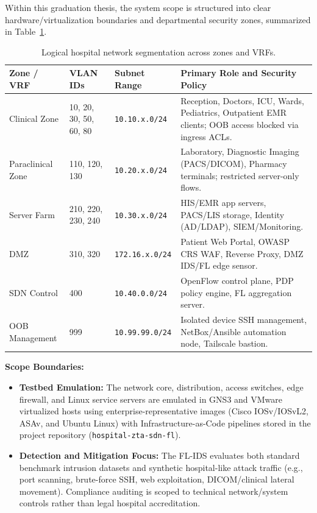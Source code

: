 Within this graduation thesis, the system scope is structured into clear hardware/virtualization boundaries and departmental security zones, summarized in Table~\ref{tab:vlan_zones}.

\begin{table}[htbp]
  \centering
  \caption{Logical hospital network segmentation across zones and VRFs.}
  \label{tab:vlan_zones}
  \begin{tabular}{@{}l l l p{5.8cm}@{}}
    \toprule
    \textbf{Zone / VRF} & \textbf{VLAN IDs} & \textbf{Subnet Range} & \textbf{Primary Role and Security Policy} \\
    \midrule
    Clinical Zone & 10, 20, 30, 50, 60, 80 & \texttt{10.10.x.0/24} & Reception, Doctors, ICU, Wards, Pediatrics, Outpatient EMR clients; OOB access blocked via ingress ACLs. \\
    Paraclinical Zone & 110, 120, 130 & \texttt{10.20.x.0/24} & Laboratory, Diagnostic Imaging (PACS/DICOM), Pharmacy terminals; restricted server-only flows. \\
    Server Farm & 210, 220, 230, 240 & \texttt{10.30.x.0/24} & HIS/EMR app servers, PACS/LIS storage, Identity (AD/LDAP), SIEM/Monitoring. \\
    DMZ & 310, 320 & \texttt{172.16.x.0/24} & Patient Web Portal, OWASP CRS WAF, Reverse Proxy, DMZ IDS/FL edge sensor. \\
    SDN Control & 400 & \texttt{10.40.0.0/24} & OpenFlow control plane, PDP policy engine, FL aggregation server. \\
    OOB Management & 999 & \texttt{10.99.99.0/24} & Isolated device SSH management, NetBox/Ansible automation node, Tailscale bastion. \\
    \bottomrule
  \end{tabular}
\end{table}

\textbf{Scope Boundaries:}
\begin{itemize}[leftmargin=1.8em, itemsep=4pt]
  \item \textbf{Testbed Emulation:} The network core, distribution, access switches, edge firewall, and Linux service servers are emulated in GNS3 and VMware virtualized hosts using enterprise-representative images (Cisco IOSv/IOSvL2, ASAv, and Ubuntu Linux) with Infrastructure-as-Code pipelines stored in the project repository (\texttt{hospital-zta-sdn-fl}).
  \item \textbf{Detection and Mitigation Focus:} The FL-IDS evaluates both standard benchmark intrusion datasets and synthetic hospital-like attack traffic (e.g., port scanning, brute-force SSH, web exploitation, DICOM/clinical lateral movement). Compliance auditing is scoped to technical network/system controls rather than legal hospital accreditation.
\end{itemize}

